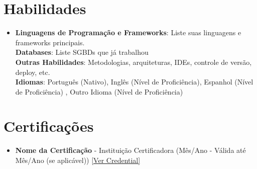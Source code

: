 \documentclass[letterpaper,11pt]{article}
\begin{document}
\section{Habilidades}
\begin{itemize}[leftmargin=0.15in, label={}]
    \item\small{
        \textbf{Linguagens de Programação e Frameworks}{: Liste suas linguagens e frameworks principais.} \\
        \textbf{Databases}{: Liste SGBDs que já trabalhou} \\
        \textbf{Outras Habilidades}{: Metodologias, arquiteturas, IDEs, controle de versão, deploy, etc.} \\
        \textbf{Idiomas}{: Português (Nativo), Inglês (Nível de Proficiência), Espanhol (Nível de Proficiência) , Outro Idioma (Nível de Proficiência)}}
    \vspace{-4pt}
\end{itemize}

\section{Certificações}
\begin{itemize}[leftmargin=0.15in, label={}]
    \item\small{
        \textbf{Nome da Certificação} - Instituição Certificadora (Mês/Ano - Válida até Mês/Ano (se aplicável)) \href{https:///www.google.com}{[Ver Credential]} 
    }
    \vspace{-4pt}
\end{itemize}

\end{document}
